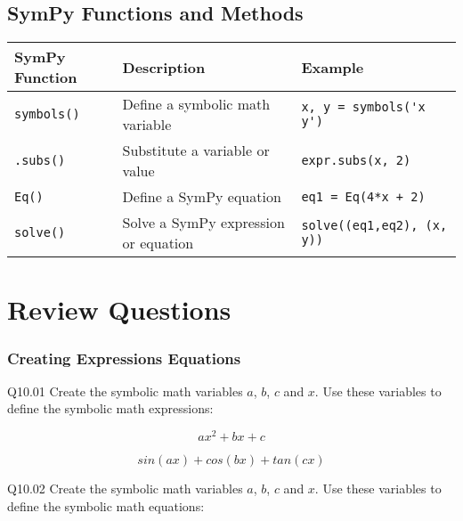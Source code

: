 \documentclass{book}
\newcommand{\passthrough}[1]{#1}
\begin{document}
    




    
        \hypertarget{sympy-functions-and-methods}{%
\subsection{SymPy Functions and
Methods}\label{sympy-functions-and-methods}}
    




    
        \begin{longtable}[]{@{}lll@{}}
\toprule
SymPy Function & Description & Example\tabularnewline
\midrule
\endhead
\passthrough{\lstinline!symbols()!} & Define a symbolic math variable &
\passthrough{\lstinline!x, y = symbols('x y')!}\tabularnewline
\passthrough{\lstinline!.subs()!} & Substitute a variable or value &
\passthrough{\lstinline!expr.subs(x, 2)!}\tabularnewline
\passthrough{\lstinline!Eq()!} & Define a SymPy equation &
\passthrough{\lstinline!eq1 = Eq(4*x + 2)!}\tabularnewline
\passthrough{\lstinline!solve()!} & Solve a SymPy expression or equation
& \passthrough{\lstinline!solve((eq1,eq2), (x, y))!}\tabularnewline
\bottomrule
\end{longtable}
    




    
        \hypertarget{review-questions}{%
\section{Review Questions}\label{review-questions}}
    




    
        \hypertarget{creating-expressions-equations}{%
\subsubsection{Creating Expressions
Equations}\label{creating-expressions-equations}}
    




    
        Q10.01 Create the symbolic math variables \(a\), \(b\), \(c\) and \(x\).
Use these variables to define the symbolic math expressions:

\[ ax^2 + bx + c \]

\[ sin(ax) + cos(bx) + tan(cx) \]

Q10.02 Create the symbolic math variables \(a\), \(b\), \(c\) and \(x\).
Use these variables to define the symbolic math equations:
\end{document}
